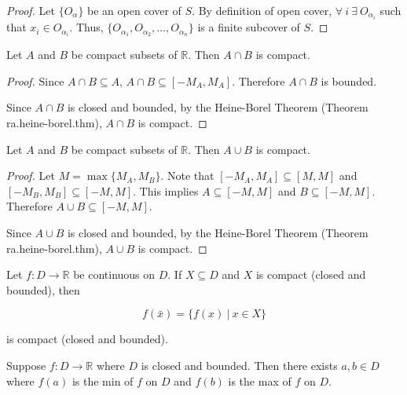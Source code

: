 \begin{proof} Let \(\{O_\alpha\}\) be an open cover of \(S\). By definition of open cover, \(\forall \ i \ \exists \ O_{\alpha_i}\) such that \(x_i \in O_{\alpha_i}\). Thus, \( \{O_{\alpha_1}, O_{\alpha_2}, \ldots, O_{\alpha_n} \} \) is a finite subcover of \(S\). \end{proof}

\begin{proposition}\label{ra.hw6.5a} Let \(A\) and \(B\) be compact subsets of \(\mathbb{R}\). Then \(A \cap B\) is compact. \end{proposition}

\begin{proof} Since \(A \cap B \subseteq A\), \(A \cap B \subseteq [-M_A, M_A]\). Therefore \(A \cap B\) is bounded.

Since \(A \cap B\) is closed and bounded, by the Heine-Borel Theorem (Theorem {ra.heine-borel.thm}), \(A \cap B\) is compact.

\end{proof}

\begin{proposition}\label{ra.hw6.5b} Let \(A\) and \(B\) be compact subsets of \(\mathbb{R}\). Then \(A \cup B\) is compact. \end{proposition}

\begin{proof} Let \(M = \max \{ M_A, M_B \} \). Note that \([-M_A, M_A] \subseteq [M, M]\) and \([-M_B, M_B] \subseteq [-M, M]\). This implies \(A \subseteq [-M, M]\) and \(B \subseteq [-M, M]\). Therefore \(A \cup B \subseteq [-M, M]\).

Since \(A \cup B\) is closed and bounded, by the Heine-Borel Theorem (Theorem {ra.heine-borel.thm}), \(A \cup B\) is compact.

\end{proof}

\begin{theorem} Let \(f: D \to \mathbb{R}\) be continuous on \(D\). If \(X \subseteq D\) and \(X\) is compact (closed and bounded), then

\[
f(\bar{x}) = \{f(x) \ | \ x \in X\}
\]

is compact (closed and bounded).

\end{theorem}

\begin{corollary} Suppose \(f: D \to \mathbb{R}\) where \(D\) is closed and bounded. Then there exists \(a, b \in D\) where \(f(a)\) is the min of \(f\) on \(D\) and \(f(b)\) is the max of \(f\) on \(D\).

\end{corollary}

